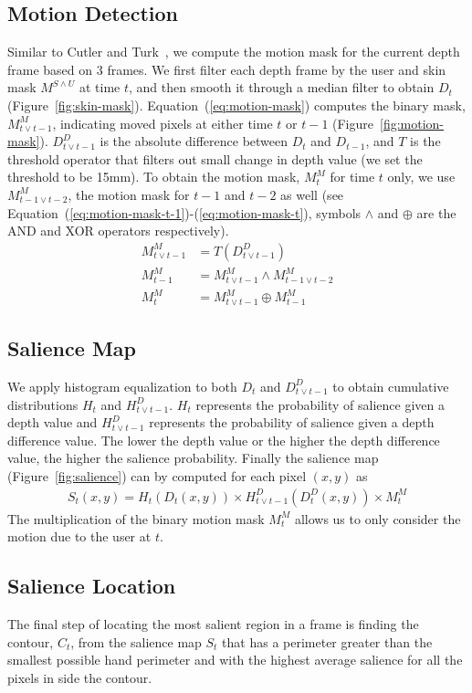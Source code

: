 \documentclass{sigchi}
\begin{document}
\subsection{Motion Detection}
Similar to Cutler and Turk~\cite{cutler1998}, we compute the motion mask for the current depth frame based on 3 frames. We first filter each 
depth frame by the user and skin mask $M^{S\wedge U}$ at time $t$, and then
smooth it through a median filter to obtain $D_t$  (Figure~\ref{fig:skin-mask}).
Equation~(\ref{eq:motion-mask}) computes the binary mask, $M_{t\vee t-1}^M$, indicating moved pixels at either time $t$ or $t - 1$ (Figure~\ref{fig:motion-mask}).
$D_{t\vee t-1}^{D}$ is the absolute difference between $D_t$ and $D_{t-1}$, and $T$ is the threshold operator that filters out small change in depth value 
(we set the threshold to be 15mm). 
To obtain the motion mask, $M_{t}^M$ for time $t$ only, we use $M_{t-1\vee t-2}^M$, the motion mask for $t-1$ and $t-2$ as well (see Equation~(\ref{eq:motion-mask-t-1})-(\ref{eq:motion-mask-t}),
symbols $\wedge$ and $\oplus$ are the AND and XOR operators respectively).
\begin{align}
M_{t\vee t-1}^M &= T(D_{t\vee t-1}^{D}) \label{eq:motion-mask} \\
M_{t-1}^M &= M_{t\vee t-1}^M \wedge M_{t-1\vee t-2}^M \label{eq:motion-mask-t-1}\\
M_{t}^M &= M_{t\vee t-1}^M \oplus M_{t-1}^M \label{eq:motion-mask-t}
\end{align}

\subsection{Salience Map}
We apply histogram equalization to both $D_t$ and $D_{t\vee t-1}^{D}$ to obtain cumulative distributions $H_t$ and $H_{t\vee t-1}^D$.
$H_t$ represents the probability of salience given a depth value and $H_{t\vee t-1}^D$ represents the probability of salience given
a depth difference value. The lower the depth value or the higher the depth difference value, the higher the salience probability.
Finally the salience map (Figure~\ref{fig:salience}) can by computed for each pixel $(x, y)$ as
\begin{align}
S_t(x, y) = H_t(D_t(x, y)) \times H_{t\vee t-1}^D(D_t^D(x, y)) \times M_t^M
\end{align}
The multiplication of the binary motion mask $M_t^M$ allows us to only consider the motion due to the user at $t$.
 
\subsection{Salience Location}
The final step of locating the most salient region in a frame is finding the
contour, $C_t$, from the salience map $S_t$ that has a perimeter greater than
the smallest possible hand perimeter and with the highest average salience for all the pixels in side the contour.
\end{document}
